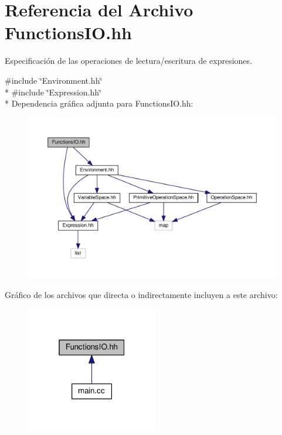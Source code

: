 \hypertarget{_functions_i_o_8hh}{}\section{Referencia del Archivo Functions\+I\+O.\+hh}
\label{_functions_i_o_8hh}


Especificación de las operaciones de lectura/escritura de expresiones.  


{\ttfamily \#include \char`\"{}Environment.\+hh\char`\"{}}\\*
{\ttfamily \#include \char`\"{}Expression.\+hh\char`\"{}}\\*
Dependencia gráfica adjunta para Functions\+I\+O.\+hh\+:
\nopagebreak
\begin{figure}[H]
\begin{center}
\leavevmode
\includegraphics[width=350pt]{_functions_i_o_8hh__incl}
\end{center}
\end{figure}
Gráfico de los archivos que directa o indirectamente incluyen a este archivo\+:
\nopagebreak
\begin{figure}[H]
\begin{center}
\leavevmode
\includegraphics[width=163pt]{_functions_i_o_8hh__dep__incl}
\end{center}
\end{figure}
